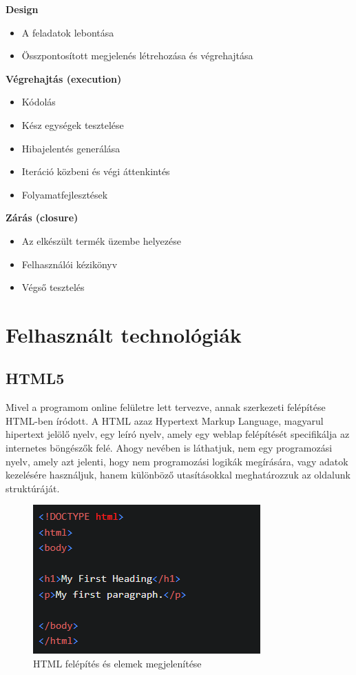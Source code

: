 \textbf{Design}
\begin{itemize}
\item A feladatok lebontása
\item Összpontosított megjelenés létrehozása és végrehajtása
\end{itemize}

\textbf{Végrehajtás (execution)}
\begin{itemize}
\item Kódolás
\item Kész egységek tesztelése
\item Hibajelentés generálása
\item Iteráció közbeni és végi áttenkintés
\item Folyamatfejlesztések
\end{itemize}

\textbf{Zárás (closure)}
\begin{itemize}
\item Az elkészült termék üzembe helyezése
\item Felhasználói kézikönyv
\item Végső tesztelés
\end{itemize}

\section{Felhasznált technológiák}

\subsection{HTML5}
Mivel a programom online felületre lett tervezve, annak szerkezeti felépítése HTML-ben íródott. A HTML azaz Hypertext Markup Language, magyarul hipertext jelölő nyelv, egy leíró nyelv, amely egy weblap felépítését specifikálja az internetes böngészők felé. Ahogy nevében is láthatjuk, nem egy programozási nyelv, amely azt jelenti, hogy nem programozási logikák megírására, vagy adatok kezelésére használjuk, hanem különböző utasításokkal meghatározzuk az oldalunk struktúráját. \\

\begin{figure}[h]
\centering
\includegraphics[scale=0.8]{images/htmlExample.png}
\caption{HTML felépítés és elemek megjelenítése}
\end{figure}

